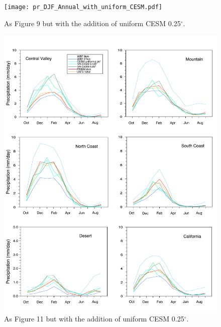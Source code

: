 \documentclass[draft,ms]{agutexSI}
\begin{document}
\begin{figure}
\begin{center}
\texttt{[image: pr\_DJF\_Annual\_with\_uniform\_CESM.pdf]}
\caption{As Figure 9 but with the addition of uniform CESM 0.25$^\circ$.}
\end{center}
\end{figure}

\begin{figure}
\begin{center}
\includegraphics[width=6in]{trd_pr_allzones_with_uniform_CESM.pdf}
\caption{As Figure 11 but with the addition of uniform CESM 0.25$^\circ$.}
\end{center}
\end{figure}

\clearpage
\end{document}
